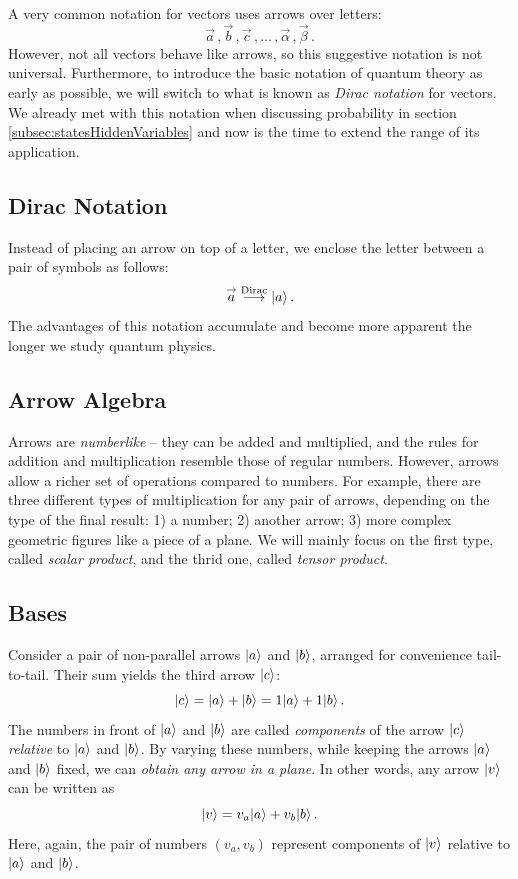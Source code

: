 A very common notation for vectors uses arrows over letters:
\[
\vec{a}\,,\vec{b}\,,\vec{c}\,,\ldots\,,\vec{\alpha}\,,\vec{\beta}\,.
\]
However, not all vectors behave like arrows, so this suggestive notation is not universal. Furthermore, to introduce the basic notation of quantum theory as early as possible, we will switch to what is known as \emph{Dirac notation} for vectors. We already met with this notation when discussing probability in section \ref{subsec:statesHiddenVariables} and now is the time to extend the range of its application.

\subsection{Dirac Notation}
Instead of placing an arrow on top of a letter, we enclose the letter between a pair of symbols as follows:
\[
\overset{\rightarrow}{a}\overset{\textrm{Dirac}}{\longrightarrow}|{a}\rangle\,.
\]
The advantages of this notation accumulate and become more apparent the longer we study quantum physics.

\subsection{Arrow Algebra}
Arrows are \emph{numberlike} -- they can be added and multiplied, and the rules for addition and multiplication resemble those of regular numbers. However, arrows allow a richer set of operations compared to numbers. For example, there are three different types of multiplication for any pair of arrows, depending on the type of the final result: 1) a number; 2) another arrow; 3) more complex geometric figures like a piece of a plane. We will mainly focus on the first type, called \emph{scalar product}, and the thrid one, called \emph{tensor product}.

\subsection{Bases}
Consider a pair of non-parallel arrows $|{a}\rangle$ and $|{b}\rangle$, arranged for convenience tail-to-tail. Their sum yields the third arrow $|{c}\rangle$:
\[
|{c}\rangle = |{a}\rangle + |{b}\rangle = 1|{a}\rangle+1|{b}\rangle\,.
\]
The numbers in front of $|{a}\rangle$ and $|{b}\rangle$ are called \emph{components} of the arrow $|{c}\rangle$ \emph{relative} to $|{a}\rangle$ and $|{b}\rangle$. By varying these numbers, while keeping the arrows $|{a}\rangle$ and $|{b}\rangle$ fixed, we can \emph{obtain any arrow in a plane}. In other words, any arrow $|{v}\rangle$ can be written as
\[
|{v}\rangle = v_a|{a}\rangle+v_b|{b}\rangle\,.
\]
Here, again, the pair of numbers $(v_a, v_b)$ represent components of $|{v}\rangle$ relative to $|{a}\rangle$ and $|{b}\rangle$. 

